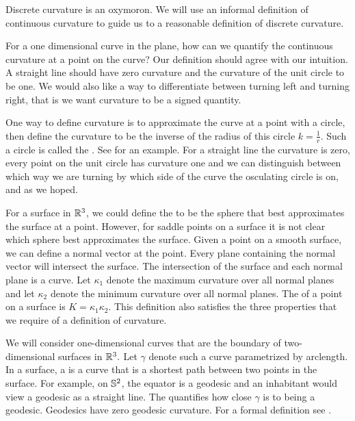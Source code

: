 
Discrete curvature is an oxymoron.
We will use an informal definition of continuous curvature to guide
us to a reasonable definition of discrete curvature. 


For a one dimensional curve in the plane,
how can we quantify the continuous curvature at a point on the curve?
Our definition should agree with our intuition. A straight line
should have zero curvature and the curvature of the unit circle to be one.
We would also like a way to differentiate
between turning left and turning right, that is we want curvature to be a signed quantity.

One way to define curvature is to approximate the curve at a point with a circle,
 then define the curvature to be the inverse of the radius of this circle $k=\frac{1}{r}$.
Such a circle is called the .
See  for an example.
For a straight line the curvature is zero, 
every point on the unit circle has curvature one 
and we can distinguish between
which way we are turning by which side of the curve the osculating circle is on,
 and as we hoped. 

For a surface in $\mathbb{R}^3$, we could define the 
to be the sphere that best approximates the surface at a point.
However, for saddle points on a surface it is not clear which sphere
best approximates the surface.
Given a point on a smooth surface, we can define a normal vector at the point.
Every plane containing the normal vector will intersect the surface.
The intersection of the surface and each normal plane is a curve. 
Let $\kappa_1$ denote the maximum curvature over all normal planes
and let $\kappa_2$ denote the minimum curvature over all normal planes.
The  of a point on a surface is
$K=\kappa_1\kappa_2.$
This definition also satisfies the three properties that we require of a definition of
curvature.



We will consider one-dimensional curves that are the boundary of two-dimensional
surfaces in $\mathbb{R}^3.$ Let $\gamma$ denote such a curve parametrized by arclength.
In a surface, a  is a curve that is a shortest path
between two points in the surface. 
For example, on $\mathbb{S}^2$, the equator is a geodesic
and an inhabitant would view a geodesic as a straight line. 
The  quantifies how close $\gamma$ is to being a geodesic.
Geodesics have zero geodesic curvature. 
For a formal definition see \cite{doc76}.



